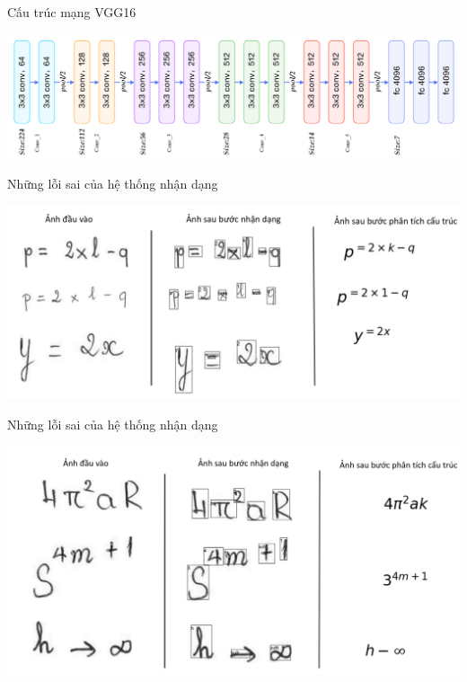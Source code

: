 \documentclass{beamer}
\begin{document}
	\begin{frame}{Cấu trúc mạng VGG16}
		\begin{center}
			\centering
			\includegraphics[width=0.95\linewidth]{vgg16.png}
			\vspace{0.5cm}
		\end{center}
	\end{frame}
	
	\begin{frame}{Những lỗi sai của hệ thống nhận dạng}
		\begin{center}
			\centering
			\includegraphics[width=0.775\linewidth]{phuluc_loi}
			\vspace{0.5cm}
		\end{center}
	\end{frame}
	
	\begin{frame}{Những lỗi sai của hệ thống nhận dạng}
		\begin{center}
			\centering
			\includegraphics[width=0.775\linewidth]{phuluc_sainhan}
			\vspace{0.5cm}
		\end{center}
	\end{frame}
	
\end{document}

